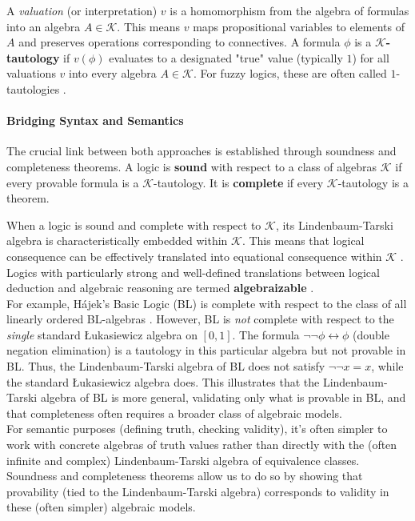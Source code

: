 A \textit{valuation} (or interpretation) $v$ is a homomorphism from the algebra of formulas into an algebra $A \in \mathcal{K}$. This means $v$ maps propositional variables to elements of $A$ and preserves operations corresponding to connectives. A formula $\phi$ is a $\mathcal{K}$\textbf{-tautology} if $v(\phi)$ evaluates to a designated "true" value (typically $1$) for all valuations $v$ into every algebra $A \in \mathcal{K}$. For fuzzy logics, these are often called $1$-tautologies \cite[Ch.~2]{Hajek1998}.

\paragraph{Bridging Syntax and Semantics} The crucial link between both approaches is established through soundness and completeness theorems. A logic is \textbf{sound} with respect to a class of algebras $\mathcal{K}$ if every provable formula is a $\mathcal{K}$-tautology. It is \textbf{complete} if every $\mathcal{K}$-tautology is a theorem.

When a logic is sound and complete with respect to $\mathcal{K}$, its Lindenbaum-Tarski algebra is characteristically embedded within $\mathcal{K}$. This means that logical consequence can be effectively translated into equational consequence within $\mathcal{K}$ \cite[Abstract]{BlokPigozzi1989}. Logics with particularly strong and well-defined translations between logical deduction and algebraic reasoning are termed \textbf{algebraizable} \cite[Def.~2.10]{BlokPigozzi1989}.\\

For example, Hájek's Basic Logic (BL) \cite[Ch.~2]{Hajek1998} is complete with respect to the class of all linearly ordered BL-algebras \cite[Thm.~2.3.15]{Hajek1998}. However, BL is \textit{not} complete with respect to the \textit{single} standard Łukasiewicz algebra on $[0,1]$. The formula $\neg \neg \phi \leftrightarrow \phi$ (double negation elimination) is a tautology in this particular algebra but not provable in BL. Thus, the Lindenbaum-Tarski algebra of BL does not satisfy $\neg \neg x = x$, while the standard Łukasiewicz algebra does. This illustrates that the Lindenbaum-Tarski algebra of BL is more general, validating only what is provable in BL, and that completeness often requires a broader class of algebraic models.\\

For semantic purposes (defining truth, checking validity), it's often simpler to work with concrete algebras of truth values rather than directly with the (often infinite and complex) Lindenbaum-Tarski algebra of equivalence classes. Soundness and completeness theorems allow us to do so by showing that provability (tied to the Lindenbaum-Tarski algebra) corresponds to validity in these (often simpler) algebraic models.\\

